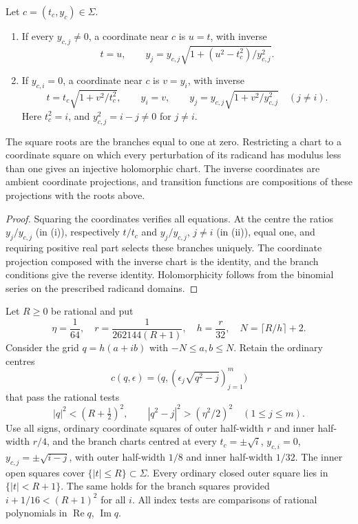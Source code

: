 \begin{lemma}\label{lem:vtr-atlas}
Let $c=(t_c,y_c)\in\Sigma$.
\begin{enumerate}[label=(\roman*)]
\item If every $y_{c,j}\ne0$, a coordinate near $c$ is $u=t$, with inverse
\[
 t=u,\qquad y_j=y_{c,j}\sqrt{1+(u^2-t_c^2)/y_{c,j}^2}.
\]
\item If $y_{c,i}=0$, a coordinate near $c$ is $v=y_i$, with inverse
\[
 t=t_c\sqrt{1+v^2/t_c^2},\qquad y_i=v,\qquad
 y_j=y_{c,j}\sqrt{1+v^2/y_{c,j}^2}\quad(j\ne i).
\]
Here $t_c^2=i$, and $y_{c,j}^2=i-j\ne0$ for $j\ne i$.
\end{enumerate}
The square roots are the branches equal to one at zero. Restricting a chart to a coordinate square on which every perturbation of
its radicand has modulus less than one gives an injective holomorphic chart. The inverse coordinates are ambient coordinate
projections, and transition functions are compositions of these projections with the roots above.
\end{lemma}

\begin{proof}
Squaring the coordinates verifies all equations. At the centre the ratios $y_j/y_{c,j}$ (in (i)), respectively $t/t_c$ and
$y_j/y_{c,j}$, $j\ne i$ (in (ii)), equal one, and requiring positive real part selects these branches uniquely. The coordinate
projection composed with the inverse chart is the identity, and the branch conditions give the reverse identity. Holomorphicity
follows from the binomial series on the prescribed radicand domains.
\end{proof}

\begin{lemma}\label{lem:vtr-cells}
Let $R\ge0$ be rational and put
\[
 \eta=\frac1{64},\quad r=\frac1{262144(R+1)},\quad h=\frac r{32},\quad
 N=\lceil R/h\rceil+2.
\]
Consider the grid $q=h(a+ib)$ with $-N\le a,b\le N$. Retain the ordinary centres
\[
 c(q,\epsilon)=\bigl(q,(\epsilon_j\sqrt{q^2-j})_{j=1}^m\bigr)
\]
that pass the rational tests
\[
 |q|^2<(R+\tfrac12)^2,\qquad |q^2-j|^2>(\eta^2/2)^2\quad(1\le j\le m).
\]
Use all signs, ordinary coordinate squares of outer half-width $r$ and inner half-width $r/4$, and the branch charts centred at
every $t_c=\pm\sqrt i$, $y_{c,i}=0$, $y_{c,j}=\pm\sqrt{i-j}$, with outer half-width $1/8$ and inner half-width $1/32$. The inner
open squares cover $\{|t|\le R\}\subset\Sigma$. Every ordinary closed outer square lies in $\{|t|<R+1\}$. The same holds for the
branch squares provided $i+1/16<(R+1)^2$ for all $i$. All index tests are comparisons of rational polynomials in
$\operatorname{Re}q$, $\operatorname{Im}q$.
\end{lemma}

